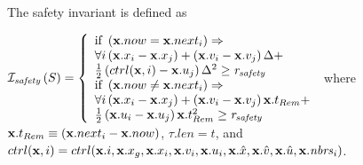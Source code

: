\documentclass[10pt, conference, compsocconf]{IEEEtran}
\begin{document}
\begin{inv}
The safety invariant is defined as 

${\cal I}_{\mathit{safety}}\left(S\right) = 
	\left\{ \begin{array}{l}
		\textrm{if } \left( {\bf x}.now = {\bf x}.next_i \right) \Rightarrow \\
		\forall i \left({\bf x}.x_{i} - {\bf x}.x_{j}\right) + \left({\bf x}.v_{i} - {\bf x}.v_{j}\right)\Delta + \\ \frac{1}{2}\left(ctrl({\bf x}, i) - {\bf x}.u_j\right)\Delta^2 \geq \mathit{r_{safety}} \\
		\textrm{if } \left( {\bf x}.now \neq {\bf x}.next_i \right) \Rightarrow \\
		\forall i \left({\bf x}.x_{i} - {\bf x}.x_{j}\right) + \left({\bf x}.v_{i} - {\bf x}.v_{j}\right){\bf x}.t_{Rem} + \\ \frac{1}{2}\left({\bf x}.u_i - {\bf x}.u_j\right){\bf x}.t_{Rem}^2 \geq  \mathit{r_{safety}} \\
	\end{array}
\right.$
%
where ${\bf x}.t_{Rem} \equiv \left({\bf x}.next_i - {\bf x}.now\right)$, $\tau.len = t$, and $ctrl({\bf x}, i)=ctrl({\bf x}.i, {\bf x}.x_g, {\bf x}.x_i, {\bf x}.v_i, {\bf x}.u_i, {\bf x}.\hat{x}, {\bf x}.\hat{v}, {\bf x}.\hat{u}, {\bf x}.\mathit{nbrs}_i)$.
\end{inv}
\end{document}
